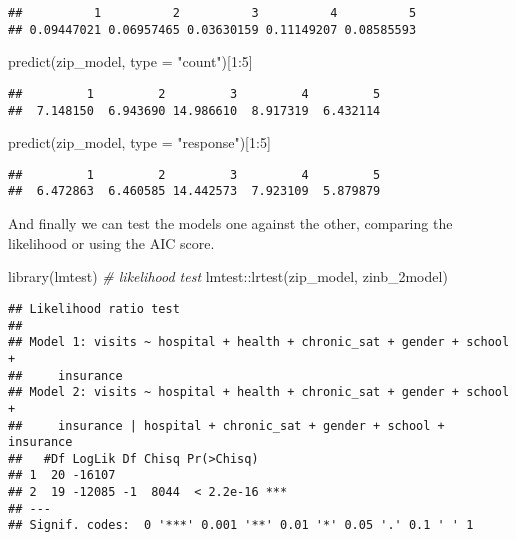 \documentclass[
  oneside]{book}
\newenvironment{Shaded}{\begin{snugshade}}{\end{snugshade}}
\newcommand{\AttributeTok}[1]{\textcolor[rgb]{0.77,0.63,0.00}{#1}}
\newcommand{\CommentTok}[1]{\textcolor[rgb]{0.56,0.35,0.01}{\textit{#1}}}
\newcommand{\DecValTok}[1]{\textcolor[rgb]{0.00,0.00,0.81}{#1}}
\newcommand{\FunctionTok}[1]{\textcolor[rgb]{0.00,0.00,0.00}{#1}}
\newcommand{\NormalTok}[1]{#1}
\newcommand{\SpecialCharTok}[1]{\textcolor[rgb]{0.00,0.00,0.00}{#1}}
\newcommand{\StringTok}[1]{\textcolor[rgb]{0.31,0.60,0.02}{#1}}
\begin{document}
\begin{verbatim}
##          1          2          3          4          5 
## 0.09447021 0.06957465 0.03630159 0.11149207 0.08585593
\end{verbatim}

\begin{Shaded}
\begin{Highlighting}[]
\FunctionTok{predict}\NormalTok{(zip\_model, }\AttributeTok{type =} \StringTok{"count"}\NormalTok{)[}\DecValTok{1}\SpecialCharTok{:}\DecValTok{5}\NormalTok{]}
\end{Highlighting}
\end{Shaded}

\begin{verbatim}
##         1         2         3         4         5 
##  7.148150  6.943690 14.986610  8.917319  6.432114
\end{verbatim}

\begin{Shaded}
\begin{Highlighting}[]
\FunctionTok{predict}\NormalTok{(zip\_model, }\AttributeTok{type =} \StringTok{"response"}\NormalTok{)[}\DecValTok{1}\SpecialCharTok{:}\DecValTok{5}\NormalTok{]}
\end{Highlighting}
\end{Shaded}

\begin{verbatim}
##         1         2         3         4         5 
##  6.472863  6.460585 14.442573  7.923109  5.879879
\end{verbatim}

And finally we can test the models one against the other, comparing the likelihood or
using the AIC score.

\begin{Shaded}
\begin{Highlighting}[]
\FunctionTok{library}\NormalTok{(lmtest)}
\CommentTok{\# likelihood test}
\NormalTok{lmtest}\SpecialCharTok{::}\FunctionTok{lrtest}\NormalTok{(zip\_model, zinb\_2model)}
\end{Highlighting}
\end{Shaded}

\begin{verbatim}
## Likelihood ratio test
## 
## Model 1: visits ~ hospital + health + chronic_sat + gender + school + 
##     insurance
## Model 2: visits ~ hospital + health + chronic_sat + gender + school + 
##     insurance | hospital + chronic_sat + gender + school + insurance
##   #Df LogLik Df Chisq Pr(>Chisq)    
## 1  20 -16107                        
## 2  19 -12085 -1  8044  < 2.2e-16 ***
## ---
## Signif. codes:  0 '***' 0.001 '**' 0.01 '*' 0.05 '.' 0.1 ' ' 1
\end{verbatim}
\end{document}
